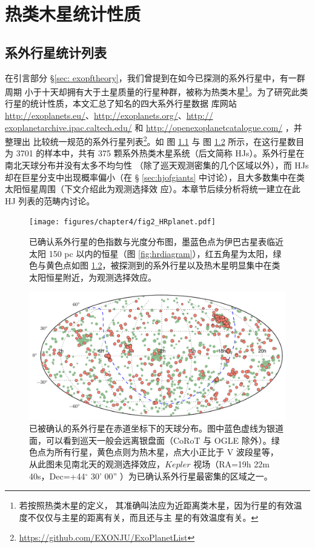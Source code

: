\chapter{热类木星统计性质} \label{chapter:data_stat}

\section{系外行星统计列表}

在引言部分 \S \ref{sec: exopftheory}，我们曾提到在如今已探测的系外行星中，有一群周期
小于十天却拥有大于土星质量的行星种群，被称为热类木星\footnote{若按照热类木星的定义，
其准确叫法应为近距离类木星，因为行星的有效温度不仅仅与主星的距离有关，而且还与主
星的有效温度有关。}。为了研究此类行星的统计性质，本文汇总了知名的四大系外行星数据
库网站 \url{http://exoplanets.eu/}、\url{http://exoplanets.org/}、\url{http://
exoplanetarchive.ipac.caltech.edu/} 和 \url{http://openexoplanetcatalogue.com/} ，并整理出
比较统一规范的系外行星列表\footnote{\url{https://github.com/EXONJU/ExoPlanetList}}。如
图 \ref{fig:hrplanet} 与 图 \ref{fig:exoskydist} 所示，在这行星数目为 3701 的样本中，共有 
375 颗系外热类木星系统（后文简称 HJs）。系外行星在南北天球分布并没有太多不均匀性
（除了巡天观测密集的几个区域以外），而 HJs 却在巨星分支中出现概率偏小（在 \S 
\ref{sec:hjofgiants} 中讨论），且大多数集中在类太阳恒星周围（下文介绍此为观测选择效
应）。本章节后续分析将统一建立在此 HJ 列表的范畴内讨论。

\begin{figure}
\centering
\texttt{[image: figures/chapter4/fig2\_HRplanet.pdf]}
\caption{已确认系外行星的色指数与光度分布图，墨蓝色点为伊巴古星表临近太阳 150 pc 以内的恒星（图 \ref{fig:hrdiagram}），红五角星为太阳，绿色与黄色点如图 \ref{fig:exoskydist}，被探测到的系外行星以及热木星明显集中在类太阳恒星附近，为观测选择效应。}
\label{fig:hrplanet}
\end{figure}


\begin{figure}
\centering
\includegraphics[width=1.0\textwidth]{figures/chapter4/fig1_exodistmollweide.pdf}
\caption{已被确认的系外行星在赤道坐标下的天球分布。图中蓝色虚线为银道面，可以看到巡天一般会远离银盘面（CoRoT 与 OGLE 除外）。绿色点为所有行星，黄色点则为热木星，点大小正比于 V 波段星等，从此图未见南北天的观测选择效应，$Kepler$ 视场（RA=19h 22m 40s，Dec=+44$^\circ$ 30' 00'' ）为已确认系外行星最密集的区域之一。}
\label{fig:exoskydist}
\end{figure}


